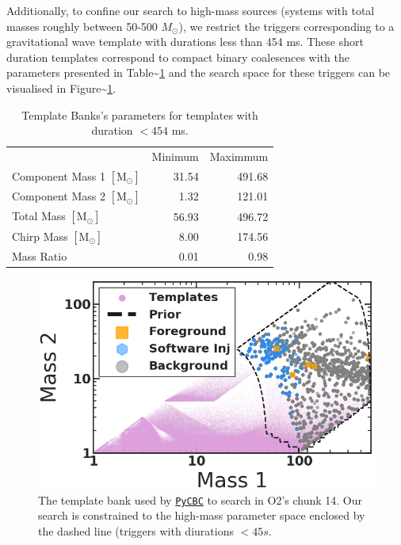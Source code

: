 \documentclass[%
 reprint,
 amsmath,amssymb,
 aps,
]{revtex4}
\begin{document}
Additionally, to confine our search to high-mass sources (systems with total masses roughly between 50-500
\(M_{\odot}\)), we restrict the triggers corresponding to a gravitational wave template with durations less than 454 ms.
These short duration templates correspond to compact binary coalesences with the parameters presented in
Table\textasciitilde\ref{tab:parameters} and the search space for these triggers can be visualised in Figure\textasciitilde\ref{fig:templateBank}.

\begin{table}[t]

\caption[BBH parameters corresponding to durations $<454$ ms]{\label{tab:parameters}Template Banks's parameters for templates with duration $<454$ ms.}
\centering
\begin{tabular}{lrr}
\toprule
  & Minimum & Maximmum\\
Component Mass 1 $[\text{M}_{\odot}]$ & 31.54 & 491.68\\
Component Mass 2 $[\text{M}_{\odot}]$ & 1.32 & 121.01\\
Total Mass $[\text{M}_{\odot}]$ & 56.93 & 496.72\\
Chirp Mass $[\text{M}_{\odot}]$ & 8.00 & 174.56\\
Mass Ratio & 0.01 & 0.98\\
\end{tabular}
\end{table}



\begin{figure}[!h]

{\centering \includegraphics[width=0.75\linewidth]{images/template_bank_masses} 

}

\caption[High-mass BCR search space.]{The template bank used by \href{https://pycbc.org/}{\texttt{PyCBC}} to search in O2's chunk 14. Our search is constrained to the high-mass parameter space enclosed by the dashed line (triggers with diurations \(<45s\).}\label{fig:templateBank}
\end{figure}
\end{document}
